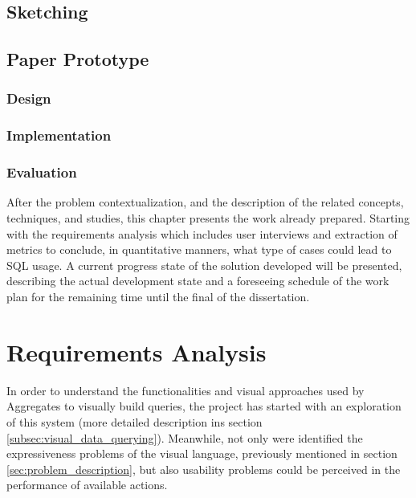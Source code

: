 \subsection{Sketching}
\label{subsec:sketching}

\subsection{Paper Prototype}
\label{subsec:paper_prototype}

\subsubsection{Design}
\label{subsubsec:paper_prototype_design}

\subsubsection{Implementation}
\label{subsubsec:paper_prototype_implementation}

\subsubsection{Evaluation}
\label{subsubsec:paper_prototype_evaluation}



\clearpage


After the problem contextualization, and the description of the related concepts, techniques, and studies, this chapter presents the work already prepared. Starting with the requirements analysis which includes user interviews and extraction of metrics to conclude, in quantitative manners, what type of cases could lead to \gls{SQL} usage. A current progress state of the solution developed will be presented, describing the actual development state and a foreseeing schedule of the work plan for the remaining time until the final of the dissertation.

\section{Requirements Analysis}
\label{sec:requirements_analysis}
In order to understand the functionalities and visual approaches used by Aggregates to visually build queries, the project has started with an exploration of this system (more detailed description ins section \ref{subsec:visual_data_querying}). Meanwhile, not only were identified the expressiveness problems of the visual language, previously mentioned in section \ref{sec:problem_description}, but also usability problems could be perceived in the performance of available actions. 

